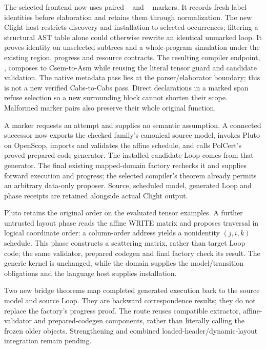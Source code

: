 The selected frontend now uses paired \  and
\  markers. It records fresh label identities
before elaboration and retains them through normalization. The new Clight host
restricts discovery and installation to selected occurrences; filtering a
structural AST table alone could otherwise rewrite an identical unmarked loop.
It proves identity on unselected subtrees and a whole-program simulation under
the existing region, progress and resource contracts. The resulting compiler
endpoint, , composes to
Csem-to-Asm while reusing the literal tensor guard and candidate validation.
The native metadata pass lies at the parser/elaborator boundary; this is not a
new verified Cabs-to-Cabs pass. Direct declarations in a marked span refuse
selection so a new surrounding block cannot shorten their scope. Malformed
marker pairs also preserve their whole original function.

A marker requests an attempt and supplies no semantic assumption. A connected
successor now exports the checked family's canonical source model, invokes
Pluto on OpenScop, imports and validates the affine schedule, and calls
PolCert's proved prepared code generator. The installed candidate Loop comes
from that generator. The final existing mapped-domain factory rechecks it and
supplies forward execution and progress; the selected compiler's theorem
already permits an arbitrary data-only proposer. Source, scheduled model,
generated Loop and phase receipts are retained alongside actual Clight output.

Pluto retains the original order on the evaluated tensor examples. A further
untrusted layout phase reads the affine WRITE matrix and proposes traversal in
logical coordinate order: a column-order address yields a nonidentity
$(j,i,k)$ schedule. This phase constructs a scattering matrix, rather than
target Loop code; the same validator, prepared codegen and final factory check
its result. The generic kernel is unchanged, while the domain supplies the
model/transition obligations and the language host supplies installation.

Two new bridge theorems map completed generated execution back to the source
model and source Loop. They are backward correspondence results; they do not
replace the factory's progress proof. The route reuses compatible extractor,
affine-validator and prepared-codegen components, rather than literally calling
the frozen older  objects. Strengthening and combined
loaded-header/dynamic-layout integration remain pending.

